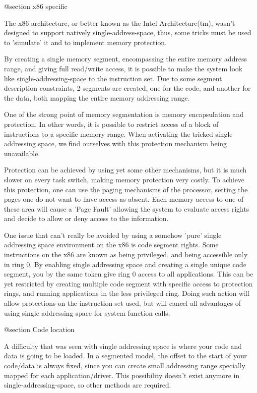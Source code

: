 @section x86 specific

The x86 architecture, or better known as the Intel Architecture(tm), wasn't
designed to support natively single-address-space, thus, some tricks must be
used to 'simulate' it and to implement memory protection.

By creating a single memory segment, encompassing the entire memory address
range, and giving full read/write access, it is possible to make the system
look like single-addressing-space to the instruction set.  Due to some segment
description constraints, 2 segments are created, one for the code, and another
for the data, both mapping the entire memory addressing range.

One of the strong point of memory segmentation is memory encapsulation and
protection.  In other words, it is possible to restrict access of a block of
instructions to a specific memory range.  When activating the tricked single
addressing space, we find ourselves with this protection mechanism being
unavailable.

Protection can be achieved by using yet some other mechanisms, but it is much
slower on every task switch, making memory protection very costly.  To achieve
this protection, one can use the paging mechanisms of the processor, setting
the pages one do not want to have access as absent.  Each memory access to one
of these area will cause a 'Page Fault' allowing the system to evaluate access
rights and decide to allow or deny access to the information.

One issue that can't really be avoided by using a somehow 'pure' single
addressing space environment on the x86 is code segment rights.  Some
instructions on the x86 are known as being privileged, and being accessible
only in ring 0.  By enabling single addressing space and creating a single
unique code segment, you by the same token give ring 0 access to all
applications.  This can be yet restricted by creating multiple code segment
with specific access to protection rings, and running applications in the
less privileged ring.  Doing such action will allow protections on the
instruction set used, but will cancel all advantages of using single addressing
space for system function calls.


@section Code location

A difficulty that was seen with single addressing space is where your code
and data is going to be loaded.  In a segmented model, the offset to the
start of your code/data is always fixed, since you can create small addressing
range specially mapped for each application/driver.  This possibility doesn't
exist anymore in single-addressing-space, so other methods are required.

